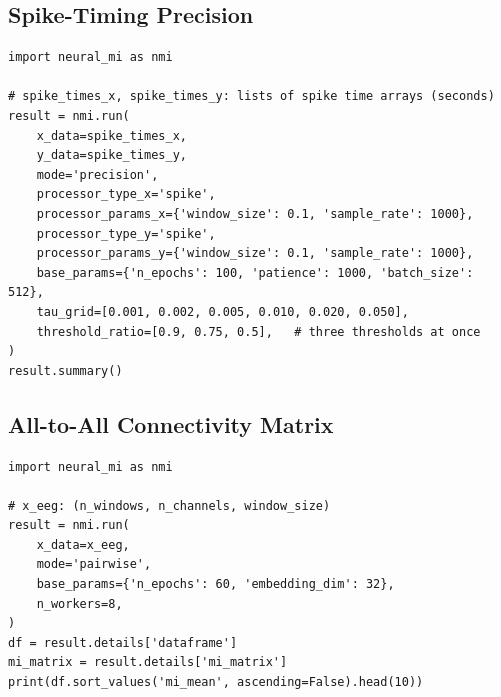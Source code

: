 \documentclass[12pt]{article}
\begin{document}
\subsection{Spike-Timing Precision}
\begin{lstlisting}
import neural_mi as nmi

# spike_times_x, spike_times_y: lists of spike time arrays (seconds)
result = nmi.run(
    x_data=spike_times_x,
    y_data=spike_times_y,
    mode='precision',
    processor_type_x='spike',
    processor_params_x={'window_size': 0.1, 'sample_rate': 1000},
    processor_type_y='spike',
    processor_params_y={'window_size': 0.1, 'sample_rate': 1000},
    base_params={'n_epochs': 100, 'patience': 1000, 'batch_size': 512},
    tau_grid=[0.001, 0.002, 0.005, 0.010, 0.020, 0.050],
    threshold_ratio=[0.9, 0.75, 0.5],   # three thresholds at once
)
result.summary()
\end{lstlisting}

\subsection{All-to-All Connectivity Matrix}
\begin{lstlisting}
import neural_mi as nmi

# x_eeg: (n_windows, n_channels, window_size)
result = nmi.run(
    x_data=x_eeg,
    mode='pairwise',
    base_params={'n_epochs': 60, 'embedding_dim': 32},
    n_workers=8,
)
df = result.details['dataframe']
mi_matrix = result.details['mi_matrix']
print(df.sort_values('mi_mean', ascending=False).head(10))
\end{lstlisting}
\end{document}
